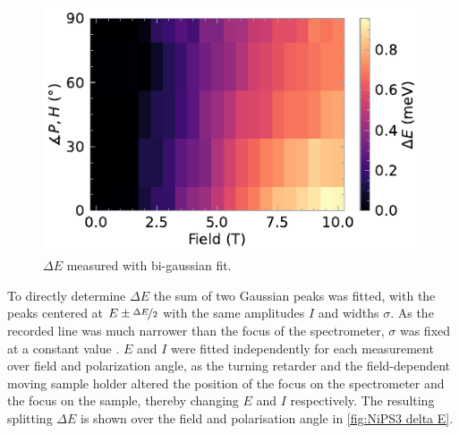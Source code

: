 \documentclass[
	twoside,
	parskip=half,
	a4paper,
]{scrbook}
\begin{document}
\begin{figure}
	\centering
	\includegraphics{../figures/2024-04-21 NiPS3 DeltaE.pdf}
	\caption{$\Delta E$ measured with bi-gaussian fit.}
	\label{fig:NiPS3 delta E}
\end{figure}
To directly determine $\Delta E$ the sum of two Gaussian peaks was fitted, with the peaks centered at $E\pm \nicefrac{\Delta E}{2}$ with the same amplitudes $I$ and widths $\sigma$.
As the recorded line was much narrower than the focus of the spectrometer, $\sigma$ was fixed at a constant value \cite{NiPS3_magnon_gap}.
$E$ and $I$ were fitted independently for each measurement over field and polarization angle, as the turning retarder and the field-dependent moving sample holder altered the position of the focus on the spectrometer and the focus on the sample, thereby changing $E$ and $I$ respectively.
The resulting splitting $\Delta E$ is shown over the field and polarisation angle in \autoref{fig:NiPS3 delta E}.
\end{document}
